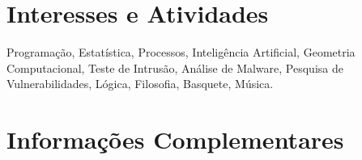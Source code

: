 \documentclass[a4paper,10pt]{article} %
\begin{document}

\section{Interesses e Atividades}

Programação, Estatística, Processos, Inteligência Artificial, Geometria Computacional, Teste de Intrusão, Análise de Malware, Pesquisa de Vulnerabilidades, Lógica,  Filosofia, Basquete, Música. %



\section{Informações Complementares}
\end{document}
